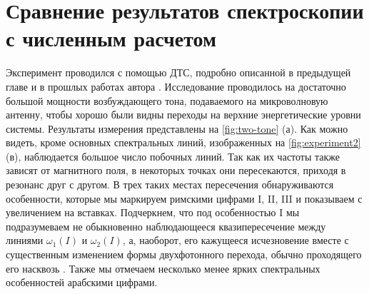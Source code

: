 \documentclass[14pt, a4paper]{extreport}
\numberwithin{equation}{section}
\begin{document}
\section{Сравнение результатов спектроскопии с численным расчетом}

Эксперимент проводился с помощью ДТС, подробно описанной в предыдущей главе и в прошлых работах автора \cite{fedorov2017}. Исследование проводилось на достаточно большой мощности возбуждающего тона, подаваемого на микроволновую антенну, чтобы хорошо были видны переходы на верхние энергетические уровни системы. Результаты измерения представлены на \autoref{fig:two-tone} (а). Как можно видеть, кроме основных спектральных линий, изображенных на \autoref{fig:experiment2} (в), наблюдается большое число побочных линий. Так как их частоты также зависят от магнитного поля, в некоторых точках они пересекаются, приходя в резонанс друг с другом. В трех таких местах пересечения обнаруживаются особенности, которые мы маркируем римскими цифрами I, II, III и показываем с увеличением на вставках. Подчеркнем, что под особенностью I мы подразумеваем не обыкновенно наблюдающееся квазипересечение между линиями $\omega_1(I)$ и $\omega_2(I)$, а, наоборот, его кажущееся исчезновение вместе с существенным изменением формы двухфотонного перехода, обычно проходящего его насквозь \cite{filipp2011multimode}. Также мы отмечаем несколько менее ярких спектральных особенностей арабскими цифрами.
\end{document}
